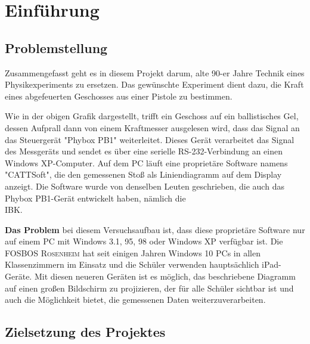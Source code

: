 \section{Einführung}
\label{sec:Introduction}

\subsection{Problemstellung}
\label{sec:Problemstellung}

Zusammengefasst geht es in diesem Projekt darum, alte 90-er Jahre Technik eines Physikexperiments zu ersetzen. Das gewünschte Experiment dient dazu, die Kraft eines abgefeuerten Geschosses aus einer Pistole zu bestimmen.

\begin{figure}[htb]
\centering
{}
\end{figure}

Wie in der obigen Grafik dargestellt, trifft ein Geschoss auf ein ballistisches Gel, dessen Aufprall dann von einem Kraftmesser ausgelesen wird, dass das Signal an das Steuergerät "Phybox PB1" weiterleitet. Dieses Gerät verarbeitet das Signal des Messgeräts und sendet es über eine serielle RS-232-Verbindung an einen Windows XP-Computer. Auf dem PC läuft eine proprietäre Software namens "CATTSoft", die den gemessenen Stoß als Liniendiagramm auf dem Display anzeigt. Die Software wurde von denselben Leuten geschrieben, die auch das Phybox PB1-Gerät entwickelt haben, nämlich die\\
\textsc{\ac{IBK}}.

\textbf{Das Problem} bei diesem Versuchsaufbau ist, dass diese proprietäre Software nur auf einem \ac{PC} mit Windows 3.1, 95, 98 oder Windows XP verfügbar ist. Die \textsc{FOSBOS Rosenheim} hat seit einigen Jahren Windows 10 \ac{PC}s in allen Klassenzimmern im Einsatz und die Schüler verwenden hauptsächlich iPad-Geräte. Mit diesen neueren Geräten ist es möglich, das beschriebene Diagramm auf einen großen Bildschirm zu projizieren, der für alle Schüler sichtbar ist und auch die Möglichkeit bietet, die gemessenen Daten weiterzuverarbeiten.

\clearpage

\subsection{Zielsetzung des Projektes}
\label{sec:Zielsetzung des Projektes}

